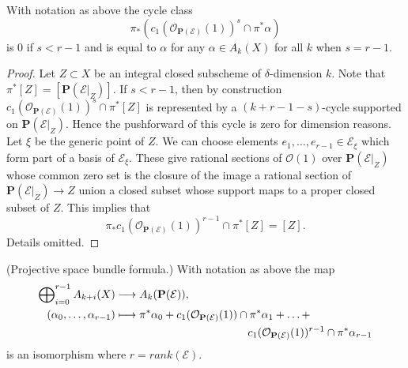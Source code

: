 \begin{lemma}
\label{lemma-cap-projective-bundle}
With notation as above the cycle class
$$
\pi_*\left(
c_1(\mathcal{O}_{\mathbf{P}(\mathcal{E})}(1))^s \cap \pi^*\alpha
\right)
$$
is $0$ if $s < r - 1$ and is equal to $\alpha$
for any $\alpha \in A_k(X)$ for all $k$ when $s = r - 1$.
\end{lemma}

\begin{proof}
Let $Z \subset X$ be an integral closed subscheme of $\delta$-dimension $k$.
Note that $\pi^*[Z] = [\mathbf{P}(\mathcal{E}|_Z)]$.
If $s < r - 1$, then by construction
$c_1(\mathcal{O}_{\mathbf{P}(\mathcal{E})}(1))^s \cap \pi^*[Z]$
is represented by a $(k + r - 1 - s)$-cycle supported on
$\mathbf{P}(\mathcal{E}|_Z)$. Hence the pushforward of this cycle
is zero for dimension reasons.
Let $\xi$ be the generic point of $Z$.
We can choose elements $e_1, \ldots, e_{r - 1} \in \mathcal{E}_\xi$
which form part of a basis of $\mathcal{E}_\xi$. These give rational
sections of $\mathcal{O}(1)$ over $\mathbf{P}(\mathcal{E}|_Z)$
whose common zero set is the closure of the image a rational section of
$\mathbf{P}(\mathcal{E}|_Z) \to Z$ union a closed subset whose
support maps to a proper closed subset of $Z$. This implies that
$$
\pi_* c_1(\mathcal{O}_{\mathbf{P}(\mathcal{E})}(1))^{r - 1} \cap \pi^*[Z]
=
[Z].
$$
Details omitted.
\end{proof}

\begin{lemma}
\label{lemma-chow-ring-projective-bundle}
(Projective space bundle formula.)
With notation as above the map
\begin{align*}
\bigoplus\nolimits_{i=0}^{r-1} A_{k + i}(X)
& \longrightarrow
A_k({\bf P}({\mathcal E})), \\
(\alpha_0,\ldots,\alpha_{r-1}) &
\longmapsto
\pi^*\alpha_0 +
c_1(\mathcal{O}_{\mathbf{P}(\mathcal{E})}(1)) \cap \pi^*\alpha_1
+ \ldots + \\
&
\quad \quad \quad \quad
\quad \quad \quad \quad
\quad \quad \quad \quad
c_1(\mathcal{O}_{\mathbf{P}(\mathcal{E})}(1))^{r - 1} \cap \pi^*\alpha_{r-1}
\end{align*}
is an isomorphism where $r = rank({\mathcal E})$.
\end{lemma}

